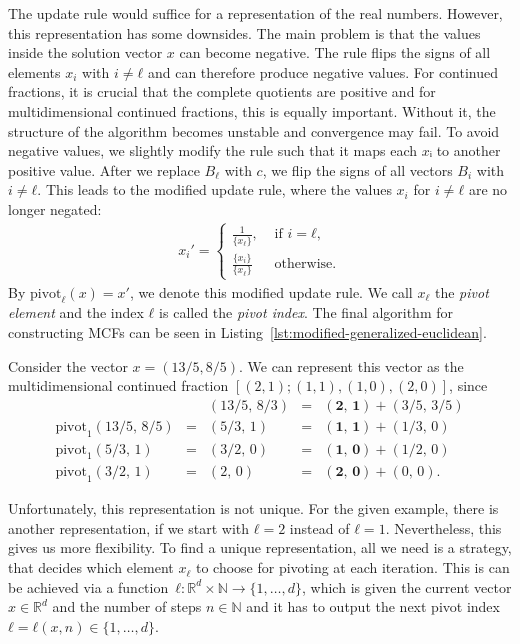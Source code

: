 The update rule would suffice for a representation of the real numbers.
However, this representation has some downsides.
The main problem is that the values inside the solution vector $x$ can become negative.
The rule flips the signs of all elements $x_i$ with $i ≠ ℓ$
and can therefore produce negative values.
For continued fractions, it is crucial that the complete quotients are positive \cite{Northshield11}
and for multidimensional continued fractions, this is equally important.
Without it, the structure of the algorithm becomes unstable and convergence may fail.
To avoid negative values, we slightly modify the rule such that it maps each $xᵢ$ to another positive value.
After we replace $B_ℓ$ with $c$, we flip the signs of all vectors $B_i$ with $i ≠ ℓ$.
This leads to the modified update rule, where the values $x_i$ for $i ≠ ℓ$ are
no longer negated:
\begin{align}
  \label{eq:modified-update-rule}
  x_i' =
  \begin{cases}
    \frac{1}{\{x_ℓ\}},  & \text{ if } i = ℓ, \\
    \frac{\{x_i\}}{\{x_ℓ\}} & \text{ otherwise.}
  \end{cases}
\end{align}
By $\mathrm{pivot}_ℓ(x) = x'$, we denote this modified update rule.
We call $x_ℓ$ the \emph{pivot element} and the index $ℓ$ is called the \emph{pivot index}.
The final algorithm for constructing MCFs can be seen in
Listing~\ref{lst:modified-generalized-euclidean}.

\begin{example}
  Consider the vector $x = (13/5, 8/5)$.
  We can represent this vector as the multidimensional continued fraction
  $[(2, 1); (1, 1), (1, 0), (2, 0)]$, since
  \[
    \begin{array}{lclcl}
                                     &   & (13/5, \, 8/3) & = & \symbf{(2, \, 1)} + (3/5, \, 3/5) \\
      \mathrm{pivot}_1(13/5, \, 8/5) & = & (5/3, \,  1)   & = & \symbf{(1, \, 1)} + (1/3, \, 0)   \\
      \mathrm{pivot}_1(5/3, \, 1)    & = & (3/2, \,  0)   & = & \symbf{(1, \, 0)} + (1/2, \, 0)   \\
      \mathrm{pivot}_1(3/2, \, 1)    & = & (2, \,    0)   & = & \symbf{(2, \, 0)} + (0, \, 0).
    \end{array}
  \]
\end{example}

Unfortunately, this representation is not unique.
For the given example, there is another representation, if we start with $ℓ = 2$ instead of $ℓ = 1$.
Nevertheless, this gives us more flexibility.
To find a unique representation, all we need is a strategy,
that decides which element $x_ℓ$ to choose for pivoting at each iteration.
This is can be achieved via a function~$ℓ \colon ℝ^d × ℕ → \{1, …, d\}$,
which is given the current vector $x ∈ ℝ^d$ and the number of steps $n ∈ ℕ$
and it has to output the next pivot index $ℓ = ℓ(x, n) ∈ \{1, …, d\}$.

